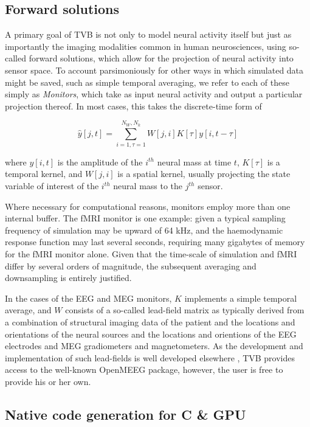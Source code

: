 \subsection{Forward solutions}

	A primary goal of TVB is not only to model neural activity itself
	but just as importantly the imaging modalities common in human 
	neurosciences, using so-called forward solutions, which allow for
	the projection of neural activity into sensor space. To account
	parsimoniously for other ways in which simulated data might be saved, 
	such as simple temporal averaging, we refer to each of these simply as 
	\textit{Monitors}, which take as input neural activity and 
	output a particular projection thereof. In most cases, this 
	takes the discrete-time form of

	\[ \hat{y}[j, t] = \sum_{i=1, \tau=1}^{N_W, N_k} W[j, i] K[\tau] y[i, t-\tau] \]

	\noindent where $y[i, t]$ is the amplitude of the $i^{th}$ neural mass at time
	$t$, $K[\tau]$ is a temporal kernel, and $W[j, i]$ is a spatial kernel,
	usually projecting the state variable of interest of the $i^{th}$ 
	neural mass to the $j^{th}$ sensor. 

	Where necessary for computational reasons, monitors employ more than 
	one internal buffer. The fMRI monitor is one 
	example: given a typical sampling frequency of simulation may be upward of 
	64 kHz, and the haemodynamic response function may last several seconds, 
	requiring many gigabytes of memory for the fMRI monitor alone. Given that 
	the time-scale of simulation and fMRI differ by several orders of magnitude, 
	the subsequent averaging and downsampling is entirely justified. 

	In the cases of the EEG and MEG monitors, $K$ implements a simple
	temporal average, and $W$ consists of a so-called lead-field matrix as typically
	derived from a combination of structural imaging data of the patient 
	and the locations and orientations of the neural sources and the locations
	and orientions of the EEG electrodes and MEG gradiometers and magnetometers. 
	As the development and implementation of such lead-fields is well developed
	elsewhere \cite{Jirsa_2002,Nolte2003,Gramfort_2010}, TVB provides access
	to the well-known OpenMEEG package, however, the user is free to provide 
	his or her own.

\subsection{Native code generation for C \& GPU}

